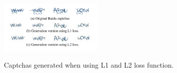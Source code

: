 \begin{figure}
  \centering
  \includegraphics[width=0.45\textwidth]{fig/preprocessing/captcha_generated.pdf} \\
  \caption{Captchas generated when using L1 and L2 loss function.}
  \label{fig: L1_L2}
\end{figure}

\begin{figure}
  \centering
\end{figure}

